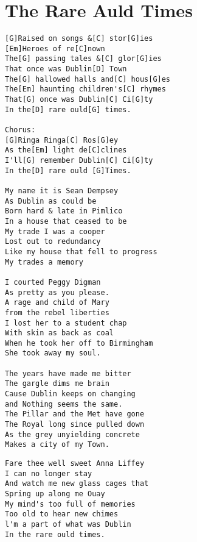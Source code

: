 \documentclass[leqno]{memoir}
\begin{document}
\chapter{The Rare Auld Times}
\begin{verbatim}
[G]Raised on songs &[C] stor[G]ies
[Em]Heroes of re[C]nown
The[G] passing tales &[C] glor[G]ies
That once was Dublin[D] Town
The[G] hallowed halls and[C] hous[G]es
The[Em] haunting children's[C] rhymes
That[G] once was Dublin[C] Ci[G]ty
In the[D] rare ould[G] times.

Chorus:
[G]Ringa Ringa[C] Ros[G]ey
As the[Em] light de[C]clines
I'll[G] remember Dublin[C] Ci[G]ty
In the[D] rare ould [G]Times.

My name it is Sean Dempsey
As Dublin as could be
Born hard & late in Pimlico
In a house that ceased to be
My trade I was a cooper
Lost out to redundancy
Like my house that fell to progress
My trades a memory

I courted Peggy Digman
As pretty as you please.
A rage and child of Mary
from the rebel liberties
I lost her to a student chap
With skin as back as coal
When he took her off to Birmingham
She took away my soul.

The years have made me bitter
The gargle dims me brain
Cause Dublin keeps on changing
and Nothing seems the same.
The Pillar and the Met have gone
The Royal long since pulled down
As the grey unyielding concrete
Makes a city of my Town.
\end{verbatim}
\newpage
\begin{verbatim}
Fare thee well sweet Anna Liffey
I can no longer stay
And watch me new glass cages that
Spring up along me Ouay
My mind's too full of memories
Too old to hear new chimes
l'm a part of what was Dublin
In the rare ould times.
\end{verbatim}
\newpage
\end{document}
